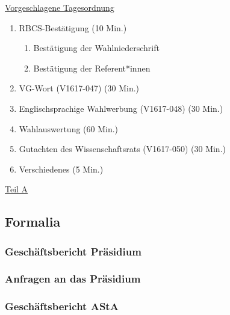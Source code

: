 \documentclass[ngerman,headheight=70pt]{scrartcl}
\begin{document}
    \newpage
    \underline{Vorgeschlagene Tagesordnung}
    \begin{enumerate}[label={\textbf{Top \theenumi}},leftmargin=*]
        \item RBCS-Bestätigung (10 Min.)
        \begin{enumerate}
            \item Bestätigung der Wahlniederschrift
            \item Bestätigung der Referent*innen
        \end{enumerate}
        \item VG-Wort (V1617-047) (30 Min.)
        \item Englischsprachige Wahlwerbung (V1617-048) (30 Min.)
        \item Wahlauswertung (60 Min.)
        \item Gutachten des Wissenschaftsrats (V1617-050) (30 Min.)
        \item Verschiedenes (5 Min.)
    \end{enumerate}

    \newpage


    {\Large \underline{Teil A}}

    \subsection{Formalia}


    \subsubsection{Geschäftsbericht Präsidium}


    \subsubsection{Anfragen an das Präsidium}



    \subsubsection{Geschäftsbericht AStA}
\end{document}
